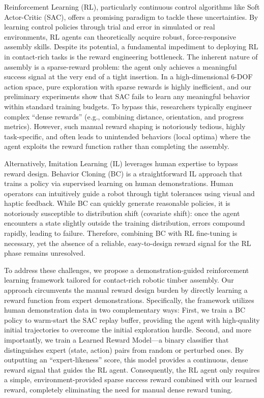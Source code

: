\documentclass[conference]{IEEEtran}
\begin{document}
Reinforcement Learning (RL), particularly continuous control algorithms like Soft Actor-Critic (SAC), offers a promising paradigm to tackle these uncertainties. By learning control policies through trial and error in simulated or real environments, RL agents can theoretically acquire robust, force-responsive assembly skills. Despite its potential, a fundamental impediment to deploying RL in contact-rich tasks is the reward engineering bottleneck. The inherent nature of assembly is a sparse-reward problem: the agent only achieves a meaningful success signal at the very end of a tight insertion. In a high-dimensional 6-DOF action space, pure exploration with sparse rewards is highly inefficient, and our preliminary experiments show that SAC fails to learn any meaningful behavior within standard training budgets. To bypass this, researchers typically engineer complex ``dense rewards'' (e.g., combining distance, orientation, and progress metrics). However, such manual reward shaping is notoriously tedious, highly task-specific, and often leads to unintended behaviors (local optima) where the agent exploits the reward function rather than completing the assembly.

Alternatively, Imitation Learning (IL) leverages human expertise to bypass reward design. Behavior Cloning (BC) is a straightforward IL approach that trains a policy via supervised learning on human demonstrations. Human operators can intuitively guide a robot through tight tolerances using visual and haptic feedback. While BC can quickly generate reasonable policies, it is notoriously susceptible to distribution shift (covariate shift): once the agent encounters a state slightly outside the training distribution, errors compound rapidly, leading to failure. Therefore, combining BC with RL fine-tuning is necessary, yet the absence of a reliable, easy-to-design reward signal for the RL phase remains unresolved.

To address these challenges, we propose a demonstration-guided reinforcement learning framework tailored for contact-rich robotic timber assembly. Our approach circumvents the manual reward design burden by directly learning a reward function from expert demonstrations. Specifically, the framework utilizes human demonstration data in two complementary ways: First, we train a BC policy to warm-start the SAC replay buffer, providing the agent with high-quality initial trajectories to overcome the initial exploration hurdle. Second, and more importantly, we train a Learned Reward Model---a binary classifier that distinguishes expert (state, action) pairs from random or perturbed ones. By outputting an ``expert-likeness'' score, this model provides a continuous, dense reward signal that guides the RL agent. Consequently, the RL agent only requires a simple, environment-provided sparse success reward combined with our learned reward, completely eliminating the need for manual dense reward tuning.
\end{document}
